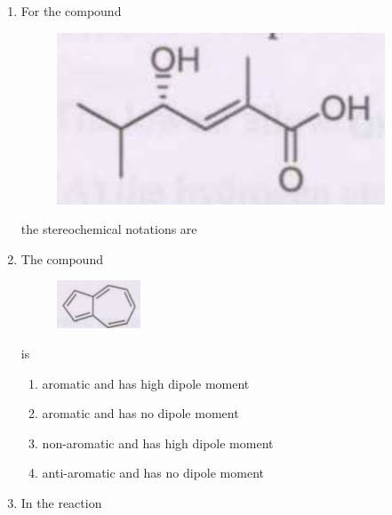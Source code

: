 \documentclass[journal,12pt,onecolumn]{IEEEtran}
\theoremstyle{remark}
\begin{document}
\begin{enumerate}
\item For the compound
    \begin{figure}[H]
        \centering
        \includegraphics[width=0.4\columnwidth]{q8}
        \caption*{}
        \label{fig:q8}
    \end{figure}
    the stereochemical notations are
    \begin{enumerate}
 
        \hfill{}
    \end{enumerate}



\item The compound
    \begin{figure}[H]
        \centering
        \includegraphics[width=0.3\columnwidth]{q9}
        \caption*{}
  
       \label{fig:q9}
    \end{figure}
    is
    \begin{enumerate}
        \item aromatic and has high dipole moment
        \item aromatic and has no dipole moment
        \item non-aromatic and has high dipole moment
        \item anti-aromatic and has no dipole moment
        \hfill{}
    \end{enumerate}



\item In the reaction


\end{enumerate}
\end{document}
